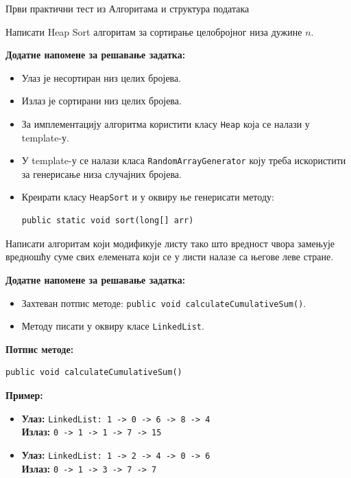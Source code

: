 
Први практични тест из Алгоритама и структура података

Написати Heap Sort алгоритам за сортирање целобројног низа дужине $n$.

\textbf{Додатне напомене за решавање задатка:}
\begin{itemize}
	\item Улаз је несортиран низ целих бројева.
	\item Излаз је сортирани низ целих бројева.
	\item За имплементацију алгоритма користити класу \texttt{Heap} која се налази у template-у.
	\item У template-у се налази класа \texttt{RandomArrayGenerator} коју треба искористити за генерисање низа случајних бројева.
	\item Креирати класу \texttt{HeapSort} и у оквиру ње генерисати методу:
	\begin{Verbatim}[fontsize=\small]
public static void sort(long[] arr)
	\end{Verbatim}
\end{itemize}

Написати алгоритам који модификује листу тако што вредност чвора замењује вредношћу суме свих елемената који се у листи налазе са његове леве стране.

\textbf{Додатне напомене за решавање задатка:}
\begin{itemize}
	\item Захтеван потпис методе: \texttt{public void calculateCumulativeSum()}.
	\item Методу писати у оквиру класе \texttt{LinkedList}.
\end{itemize}

\textbf{Потпис методе:}
\begin{Verbatim}[fontsize=\small]
public void calculateCumulativeSum()
\end{Verbatim}

\textbf{Пример:}
\begin{itemize}
	\item \textbf{Улаз:} \texttt{LinkedList: 1 -> 0 -> 6 -> 8 -> 4} \\
	      \textbf{Излаз:} \texttt{0 -> 1 -> 1 -> 7 -> 15}
	\item \textbf{Улаз:} \texttt{LinkedList: 1 -> 2 -> 4 -> 0 -> 6} \\
	      \textbf{Излаз:} \texttt{0 -> 1 -> 3 -> 7 -> 7}
\end{itemize}


